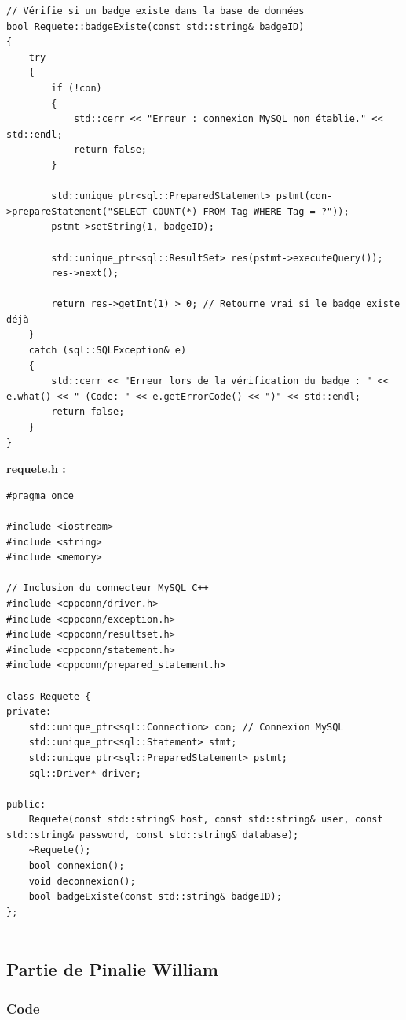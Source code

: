 \documentclass[main.tex]{subfiles}
\begin{document}
\begin{lstlisting}
// Vérifie si un badge existe dans la base de données
bool Requete::badgeExiste(const std::string& badgeID)
{
    try
    {
        if (!con)
        {
            std::cerr << "Erreur : connexion MySQL non établie." << std::endl;
            return false;
        }

        std::unique_ptr<sql::PreparedStatement> pstmt(con->prepareStatement("SELECT COUNT(*) FROM Tag WHERE Tag = ?"));
        pstmt->setString(1, badgeID);

        std::unique_ptr<sql::ResultSet> res(pstmt->executeQuery());
        res->next();

        return res->getInt(1) > 0; // Retourne vrai si le badge existe déjà
    }
    catch (sql::SQLException& e)
    {
        std::cerr << "Erreur lors de la vérification du badge : " << e.what() << " (Code: " << e.getErrorCode() << ")" << std::endl;
        return false;
    }
}
\end{lstlisting}

\textbf{requete.h :}

\begin{lstlisting}
#pragma once

#include <iostream>
#include <string>
#include <memory>

// Inclusion du connecteur MySQL C++
#include <cppconn/driver.h>
#include <cppconn/exception.h>
#include <cppconn/resultset.h>
#include <cppconn/statement.h>
#include <cppconn/prepared_statement.h>

class Requete {
private:
    std::unique_ptr<sql::Connection> con; // Connexion MySQL
    std::unique_ptr<sql::Statement> stmt;
    std::unique_ptr<sql::PreparedStatement> pstmt;
    sql::Driver* driver;

public:
    Requete(const std::string& host, const std::string& user, const std::string& password, const std::string& database);
    ~Requete();
    bool connexion();
    void deconnexion();
    bool badgeExiste(const std::string& badgeID);
};
 
\end{lstlisting}

\subsection{Partie de Pinalie William}

\subsubsection{Code}
\end{document}
